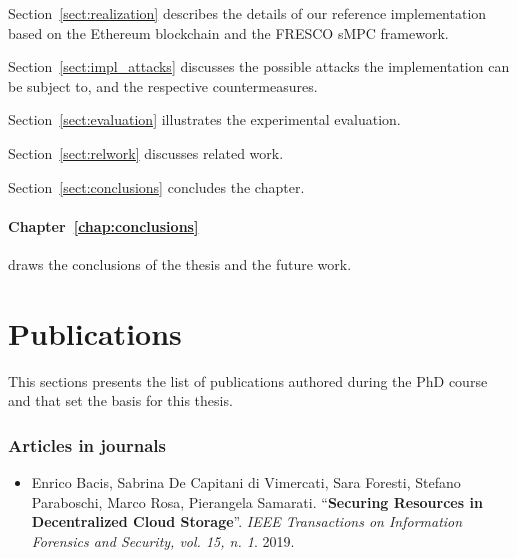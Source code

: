 {\begin{compactitem}
\item Section~\ref{sect:realization} describes the details of our reference implementation based on the Ethereum blockchain and the FRESCO sMPC framework.

\item Section~\ref{sect:impl_attacks} discusses the possible attacks the implementation can be subject to, and the respective countermeasures.

\item Section~\ref{sect:evaluation} illustrates the experimental evaluation.

\item Section~\ref{sect:relwork} discusses related work.

\item Section~\ref{sect:conclusions} concludes the chapter.
\end{compactitem}

\medskip

\paragraph*{Chapter~\ref{chap:conclusions}} draws the conclusions of the thesis and the future work.

\bigskip

%

\clearpage
\section{Publications}

This sections presents the list of publications authored during the PhD course and that set the basis for this thesis.
			
\subsubsection*{Articles in journals}
\begin{itemize}
	\nocite{tifs}
	\item Enrico Bacis, Sabrina De Capitani di Vimercati, Sara Foresti, Stefano Paraboschi,	Marco Rosa,	Pierangela Samarati. ``\textbf{Securing Resources in Decentralized Cloud Storage}''. {\em IEEE Transactions on Information Forensics and Security, vol. 15, n. 1}. 2019.
\end{itemize}

}
